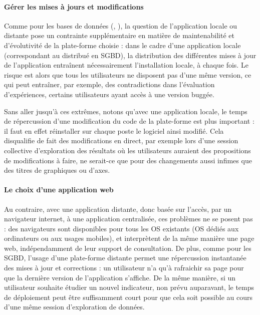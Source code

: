 \paragraph*{Gérer les mises à jours et modifications}

Comme pour les bases de données (, ), la question de l'application locale ou distante pose un contrainte supplémentaire en matière de maintenabilité et d'évolutivité de la plate-forme choisie : dans le cadre d'une application locale (correspondant au distribué en SGBD), la distribution des différentes mises à jour de l'application entraînent nécessairement l'installation locale, à chaque fois.
Le risque est alors que tous les utilisateurs ne disposent pas d'une même version, ce qui peut entraîner, par exemple, des contradictions dans l'évaluation d'expériences, certains utilisateurs ayant accès à une version \og buggée\fg{}.

Sans aller jusqu'à ces extrêmes, notons qu'avec une application locale, le temps de répercussion d'une modification du code de la plate-forme est plus important : il faut en effet réinstaller sur chaque poste le logiciel ainsi modifié.
Cela disqualifie de fait des modifications \og en direct\fg{}, par exemple lors d'une session collective d'exploration des résultats où les utilisateurs auraient des propositions de modifications à faire, ne serait-ce que pour des changements aussi infimes que des titres de graphiques ou d'axes.

\paragraph*{Le choix d'une application web}

Au contraire, avec une application distante, donc basée sur l'accès, par un navigateur internet, à une application centralisée, ces problèmes ne se posent pas : des navigateurs sont disponibles pour tous les OS existants (OS dédiés aux ordinateurs ou aux usages mobiles), et interprètent de la même manière une page web, indépendamment de leur support de consultation.
De plus, comme pour les SGBD, l'usage d'une plate-forme distante permet une répercussion instantanée des mises à jour et corrections : un utilisateur n'a qu'à rafraichir sa page pour que la dernière version de l'application s'affiche.
De la même manière, si un utilisateur souhaite étudier un nouvel indicateur, non prévu auparavant, le temps de déploiement peut être suffisamment court pour que cela soit possible au cours d'une même session d'exploration de données.

